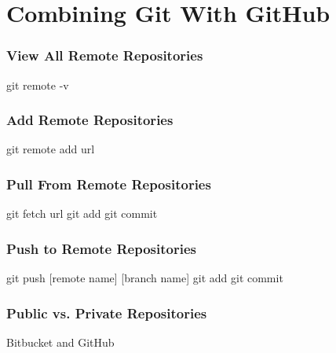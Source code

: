 
\section[GitHub]{Combining Git With GitHub}

\begin{frame}
\frametitle{View All Remote Repositories}
git remote -v
\end{frame}
\note{}

\begin{frame}
\frametitle{Add Remote Repositories}
git remote add url
\end{frame}
\note{}

\begin{frame}
\frametitle{Pull From Remote Repositories}
git fetch url
git add
git commit
\end{frame}
\note{}

\begin{frame}
\frametitle{Push to Remote Repositories}
git push [remote name] [branch name]
git add
git commit
\end{frame}
\note{}

\begin{frame}
\frametitle{Public vs. Private Repositories}
Bitbucket and GitHub
\end{frame}
\note{}